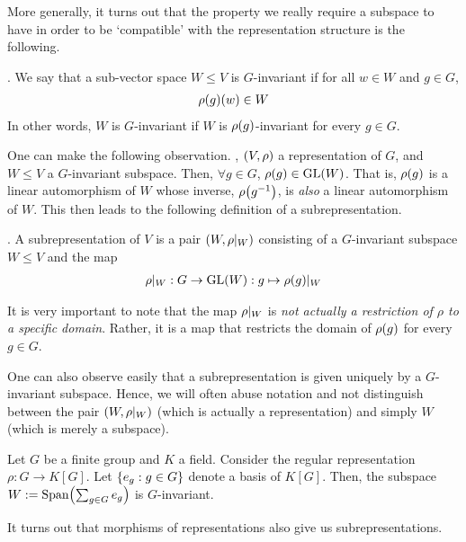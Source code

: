More generally, it turns out that the property we really require a subspace to have in order to be `compatible' with the representation structure is the following.

\begin{boxdefinition}[$G$-Invariance]
    . We say that a sub-vector space $W \leq V$ is $G$-invariant if for all $w \in W$ and $g \in G$,
    \begin{align*}
        \rho\!\left( g \right)\!(w) \in W
    \end{align*}
    In other words, $W$ is $G$-invariant if $W$ is $\rho\!\left( g \right)$-invariant for every $g \in G$.
\end{boxdefinition}

One can make the following observation. , $\left( V,\rho \right)$ a representation of $G$, and $W \leq V$ a $G$-invariant subspace. Then, $\forall g \in G$, $\rho\!\left( g \right) \in \operatorname{GL}\!\left( W \right)$. That is, $\rho\!\left( g \right)$ is a linear automorphism of $W$ whose inverse, $\rho\!\left( g^{-1} \right)$, is \textit{also} a linear automorphism of $W$. This then leads to the following definition of a subrepresentation.

\begin{boxdefinition}[Subrepresentation]
    . A subrepresentation of $V$ is a pair $\left( W, \rho\vert_{W} \right)$ consisting of a $G$-invariant subspace $W \leq V$ and the map
    \begin{align*}
        \rho\vert_{W} : G \to \operatorname{GL}\!\left( W \right) : g \mapsto \rho\!\left( g \right)\!\vert_W
    \end{align*}
\end{boxdefinition}
It is very important to note that the map $\rho\vert_{W}$ is \textit{not actually a restriction of $\rho$ to a specific domain}. Rather, it is a map that restricts the domain of $\rho\!\left( g \right)$ for every $g \in G$.

One can also observe easily that a subrepresentation is given uniquely by a $G$-invariant subspace. Hence, we will often abuse notation and not distinguish between the pair $\left( W, \rho\vert_{W} \right)$ (which is actually a representation) and simply $W$ (which is merely a subspace).

\begin{boxexample} \label{Ch1:Eg:Regular_is_Subrep}
    Let $G$ be a finite group and $K$ a field. Consider the regular representation $\rho : G \to K[G]$. Let $\left\{ e_g : g \in G \right\}$ denote a basis of $K[G]$. Then, the subspace $W := \operatorname{Span}\!\left( \sum_{g \in G} e_g \right)$ is $G$-invariant.
\end{boxexample}

It turns out that morphisms of representations also give us subrepresentations.

